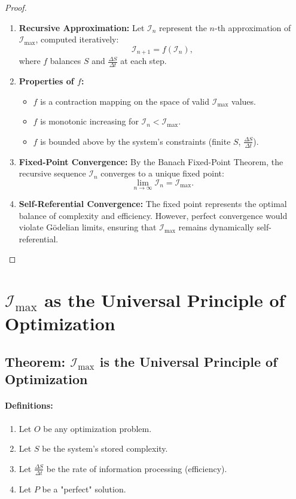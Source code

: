 \documentclass[12pt]{article}
\begin{document}
\begin{proof}
\begin{enumerate}
    \item \textbf{Recursive Approximation:}
    Let \(\mathcal{I}_n\) represent the \(n\)-th approximation of \(\mathcal{I}_{\text{max}}\), computed iteratively:
    \[
    \mathcal{I}_{n+1} = f(\mathcal{I}_n),
    \]
    where \(f\) balances \(S\) and \(\frac{\Delta S}{\Delta t}\) at each step.

    \item \textbf{Properties of \(f\):}
    \begin{itemize}
        \item \(f\) is a contraction mapping on the space of valid \(\mathcal{I}_{\text{max}}\) values.
        \item \(f\) is monotonic increasing for \(\mathcal{I}_n < \mathcal{I}_{\text{max}}\).
        \item \(f\) is bounded above by the system's constraints (finite \(S\), \(\frac{\Delta S}{\Delta t}\)).
    \end{itemize}

    \item \textbf{Fixed-Point Convergence:}
    By the Banach Fixed-Point Theorem, the recursive sequence \(\mathcal{I}_n\) converges to a unique fixed point:
    \[
    \lim_{n \to \infty} \mathcal{I}_n = \mathcal{I}_{\text{max}}.
    \]

    \item \textbf{Self-Referential Convergence:}
    The fixed point represents the optimal balance of complexity and efficiency. However, perfect convergence would violate Gödelian limits, ensuring that \(\mathcal{I}_{\text{max}}\) remains dynamically self-referential.
\end{enumerate}
\end{proof}

\section{\(\mathcal{I}_{\text{max}}\) as the Universal Principle of Optimization}

\subsection{Theorem: \(\mathcal{I}_{\text{max}}\) is the Universal Principle of Optimization}

\paragraph{Definitions:}
\begin{enumerate}
    \item Let \(O\) be any optimization problem.
    \item Let \(S\) be the system's stored complexity.
    \item Let \(\frac{\Delta S}{\Delta t}\) be the rate of information processing (efficiency).
    \item Let \(P\) be a "perfect" solution.
\end{enumerate}
\end{document}

